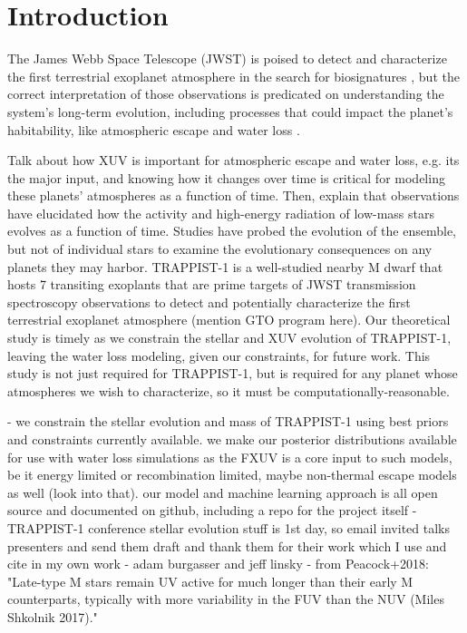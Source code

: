 \documentclass[twocolumn]{aastex62}
\begin{document}
\keywords{}


\section{Introduction} \label{sec:intro}

The James Webb Space Telescope (JWST) is poised to detect and characterize the first terrestrial exoplanet atmosphere in the search for biosignatures \citep{Morley2017,Lincowski2018,Lustig2019}, but the correct interpretation of those observations is predicated on understanding the system's long-term evolution, including processes that could impact the planet's habitability, like atmospheric escape \citep{Lammer2003,MurrayClay2009} and water loss \citep{Luger2015}. 

Talk about how XUV is important for atmospheric escape and water loss, e.g. its the major input, and knowing how it changes over time is critical for modeling these planets' atmospheres as a function of time. Then, explain that observations have elucidated how the activity and high-energy radiation of low-mass stars evolves as a function of time. Studies have probed the evolution of the ensemble, but not of individual stars to examine the evolutionary consequences on any planets they may harbor. TRAPPIST-1 is a well-studied nearby M dwarf that hosts 7 transiting exoplants that are prime targets of JWST transmission spectroscopy observations to detect and potentially characterize the first terrestrial exoplanet atmosphere (mention GTO program here). Our theoretical study is timely as we constrain the stellar and XUV evolution of TRAPPIST-1, leaving the water loss modeling, given our constraints, for future work. This study is not just required for TRAPPIST-1, but is required for any planet whose atmospheres we wish to characterize, so it must be computationally-reasonable.

- we constrain the stellar evolution and mass of TRAPPIST-1 using best priors and constraints currently available. we make our posterior distributions available for use with water loss simulations as the FXUV is a core input to such models, be it energy limited or recombination limited, maybe non-thermal escape models as well (look into that). our model and machine learning approach is all open source and documented on github, including a repo for the project itself
- TRAPPIST-1 conference stellar evolution stuff is 1st day, so email invited talks presenters and send them draft and thank them for their work which I use and cite in my own work - adam burgasser and jeff linsky
- from Peacock+2018: "Late-type M stars remain UV active for much longer than their early M counterparts, typically with more variability in the FUV than the NUV (Miles Shkolnik 2017)."
\end{document}
